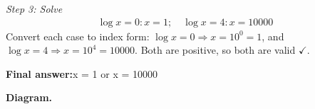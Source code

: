 \documentclass[11pt]{article}
\begin{document}
\textit{Step 3: Solve}
\[\begin{gathered}
\log x = 0: x = 1; \quad \log x = 4: x = 10000
\end{gathered}\]
Convert each case to index form: \( \log x = 0 \Rightarrow x = 10^0 = 1 \), and \( \log x = 4 \Rightarrow x = 10^4 = 10000 \). Both are positive, so both are valid $\checkmark$.

\begin{answerbox}
\textbf{Final answer:}\quad x = 1 or x = 10000
\end{answerbox}
\textbf{Diagram.}

\begin{center}
\end{center}
\end{document}
